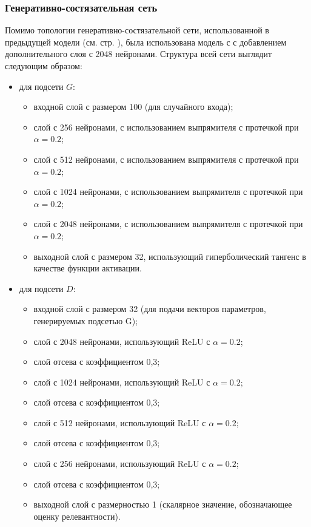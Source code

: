 \subsubsection{Генеративно-состязательная сеть}
Помимо топологии генеративно-состязательной сети, использованной в предыдущей модели (см. стр. \pageref{lab:gan-grammar}), была использована модель с
с добавлением дополнительного слоя с 2048 нейронами. Структура всей сети выглядит следующим образом:
\begin{itemize}
    \item для подсети $G$:
          \begin{itemize}
              \item входной слой с размером 100 (для случайного
                    входа);
              \item слой с 256 нейронами, с использованием выпрямителя с протечкой при $\alpha = 0.2$;
              \item слой с 512 нейронами, с использованием выпрямителя с протечкой при $\alpha = 0.2$;
              \item слой с 1024 нейронами, с использованием выпрямителя с протечкой при $\alpha = 0.2$;
              \item слой с 2048 нейронами, с использованием выпрямителя с протечкой при $\alpha = 0.2$;
              \item выходной слой с размером 32, использующий гиперболический тангенс в качестве функции активации.
          \end{itemize}
    \item для подсети $D$:
          \begin{itemize}
              \item входной слой с размером 32 (для подачи векторов параметров, генерируемых подсетью G);
              \item слой с 2048 нейронами, использующий ReLU с $\alpha = 0.2$;
              \item слой отсева с коэффициентом 0,3;
              \item слой с 1024 нейронами, использующий ReLU с $\alpha = 0.2$;
              \item слой отсева с коэффициентом 0,3;
              \item слой с 512 нейронами, использующий ReLU с $\alpha = 0.2$;
              \item слой отсева с коэффициентом 0,3;
              \item слой с 256 нейронами, использующий ReLU с $\alpha = 0.2$;
              \item слой отсева с коэффициентом 0,3;
              \item выходной слой с размерностью 1 (скалярное значение, обозначающее оценку релевантности).
          \end{itemize}
\end{itemize}

